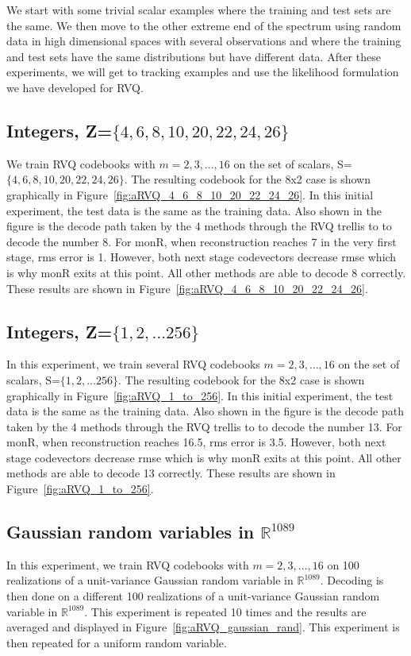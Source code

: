We start with some trivial scalar examples where the training and test sets are the same.  We then move to the other extreme end of the spectrum using random data in high dimensional spaces with several observations and where the training and test sets have the same distributions but have different data.  After these experiments, we will get to tracking examples and use the likelihood formulation we have developed for RVQ.



\subsection{Integers, Z=$\{4, 6, 8, 10, 20, 22, 24, 26\}$}
We train RVQ codebooks with $m=2, 3, \ldots, 16$ on the set of scalars, S=$\{4, 6, 8, 10, 20, 22, 24, 26\}$.  The resulting codebook for the 8x2 case is shown graphically in Figure~\ref{fig:aRVQ_4_6_8_10_20_22_24_26}.  In this initial experiment, the test data is the same as the training data.  Also shown in the figure is the decode path taken by the 4 methods through the RVQ trellis to to decode the number 8.  For monR, when reconstruction reaches 7 in the very first stage, rms error is 1.  However, both next stage codevectors decrease rmse which is why monR exits at this point.  All other methods are able to decode 8 correctly.  These results are shown in Figure~\ref{fig:aRVQ_4_6_8_10_20_22_24_26}.  
  
 
\subsection{Integers, Z=$\{1, 2, \ldots 256\}$}
In this experiment, we train several RVQ codebooks $m=2, 3, \ldots, 16$ on the set of scalars, S=$\{1, 2, \ldots 256\}$.  The resulting codebook for the 8x2 case is shown graphically in Figure~\ref{fig:aRVQ_1_to_256}.  In this initial experiment, the test data is the same as the training data.  Also shown in the figure is the decode path taken by the 4 methods through the RVQ trellis to to decode the number 13.  For monR, when reconstruction reaches 16.5, rms error is 3.5.  However, both next stage codevectors decrease rmse which is why monR exits at this point.  All other methods are able to decode 13 correctly.   These results are shown in Figure~\ref{fig:aRVQ_1_to_256}. 

\subsection{Gaussian random variables in $\mathbb{R}^{1089}$}
In this experiment, we train RVQ codebooks with $m=2, 3, \ldots, 16$ on 100 realizations of a unit-variance Gaussian random variable in $\mathbb{R}^{1089}$.  Decoding is then done on a different 100 realizations of a unit-variance Gaussian random variable in $\mathbb{R}^{1089}$.  This experiment is repeated 10 times and the results are averaged and displayed in Figure~\ref{fig:aRVQ_gaussian_rand}.  This experiment is then repeated for a uniform random variable. 

